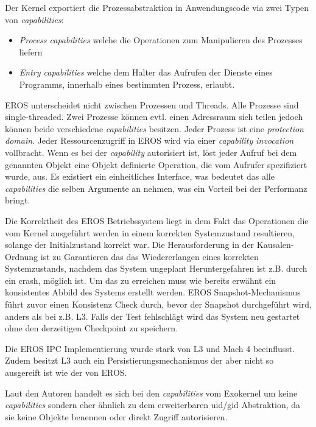 \documentclass[german, 9pt,technote]{IEEEtran}
\begin{document}
      Der Kernel exportiert die Prozessabstraktion in Anwendungscode via zwei Typen von \textit{capabilities}:
      \begin{itemize}
        \item \textit{Process capabilities} welche die Operationen zum Manipulieren des Prozesses liefern 
        \item \textit{Entry capabilities} welche dem Halter das Aufrufen der Dienste eines Programms, innerhalb eines bestimmten Prozess, erlaubt.
      \end{itemize}
        
      EROS unterscheidet nicht zwischen Prozessen und Threads. Alle Prozesse sind single-threaded. Zwei Prozesse k\"onnen evtl. einen Adressraum sich teilen
      jedoch k\"onnen beide verschiedene \textit{capabilities} besitzen. Jeder Prozess ist eine \textit{protection domain}.
      Jeder Ressourcenzugriff in EROS wird via einer \textit{capability invocation} vollbracht. Wenn es bei der \textit{capability} autorisiert ist,
      l\"ost jeder Aufruf bei dem genannten Objekt eine Objekt definierte Operation, die vom Aufrufer spezifiziert wurde, aus. 
      Es existiert ein einheitliches Interface, was bedeutet das alle \textit{capabilities} die selben Argumente an nehmen,
      was ein Vorteil bei der Performanz bringt.
        
      Die Korrektheit des EROS Betriebssystem liegt in dem Fakt das Operationen die vom Kernel ausgef\"uhrt werden  
      in einem korrekten Systemzustand resultieren, solange der Initialzustand korrekt war. Die Herausforderung in der Kausalen-Ordnung ist
      zu Garantieren das das Wiedererlangen eines korrekten Systemzustands, nachdem das System ungeplant Heruntergefahren ist z.B. durch ein crash, m\"oglich ist.
      Um das zu erreichen muss wie bereits erw\"ahnt ein konsistentes Abbild des Systems erstellt werden.
      EROS Snapshot-Mechanismus f\"uhrt zuvor einen Konsistenz Check durch, bevor der Snapshot durchgef\"uhrt wird, 
      anders als bei z.B. L3. Falls der Test fehlschl\"agt wird das System neu gestartet ohne den derzeitigen Checkpoint zu speichern. 
 
      Die EROS IPC Implementierung wurde stark von L3 und Mach 4 beeinflusst. Zudem besitzt L3 auch ein Persistierungsmechanismus der aber nicht so ausgereift 
      ist wie der von EROS.
        
      Laut den Autoren \cite{inproc:eros} handelt es sich bei den \textit{capabilities} vom Exokernel um keine 
      \textit{capabilities} sondern eher \"ahnlich zu dem erweiterbaren uid/gid Abstraktion, da sie keine Objekte benennen oder direkt Zugriff autorisieren.
      
\end{document}
